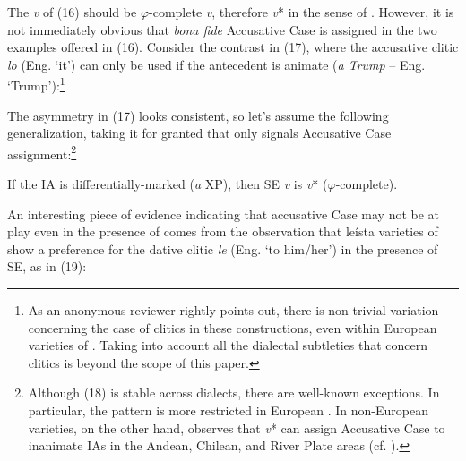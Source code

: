 \documentclass[output=paper]{langsci/langscibook}
\begin{document}
The \textit{v} of (16) should be $\varphi $-complete \textit{v}, therefore \textit{v}* in the sense of \citet{Chomsky2001Derivation}. However, it is not immediately obvious that \textit{bona fide} Accusative Case is assigned in the two examples offered in (16). Consider the contrast in (17), where the accusative clitic \textit{lo} (Eng. ‘it’) can only be used if the antecedent is animate (\textit{a Trump} – Eng. ‘Trump’):\footnote{As an anonymous reviewer rightly points out, there is non-trivial variation concerning the case of clitics in these constructions, even within European varieties of . Taking into account all the dialectal subtleties that concern clitics is beyond the scope of this paper.}

\ea%
    \label{ex:gallego:17}
    \z
\z   

The asymmetry in (17) looks consistent, so let’s assume the following generalization, taking it for granted that only \DOM signals Accusative Case assignment:\footnote{Although (18) is stable across dialects, there are well-known exceptions. In particular, the pattern is more restricted in European . In non-European varieties, on the other hand, \citet[§41.12m]{RAE-ASALE2009} observes that \textit{v}* can assign Accusative Case to inanimate IAs in the Andean, Chilean, and River Plate areas (cf. \citealt{Gallego2016}).}

\ea%
\label{ex:gallego:18}
If the IA is differentially-marked (\textit{a} XP), then SE \textit{v} is \textit{v}* ($\varphi $-complete).
\z

          

An interesting piece of evidence indicating that accusative Case may not be at play even in the presence of \DOM comes from the observation that leísta varieties of  show a preference for the dative clitic \textit{le} (Eng. ‘to him\slash her’) in the presence of SE, as in (19):
\end{document}
